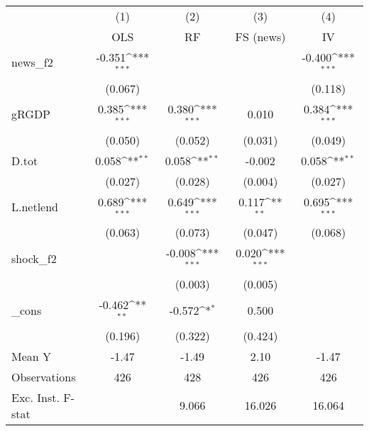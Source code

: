 {
\def\sym#1{\ifmmode^{#1}\else\(^{#1}\)\fi}
\begin{tabular}{l*{4}{c}}
\toprule
            &\multicolumn{1}{c}{(1)}&\multicolumn{1}{c}{(2)}&\multicolumn{1}{c}{(3)}&\multicolumn{1}{c}{(4)}\\
            &\multicolumn{1}{c}{OLS}&\multicolumn{1}{c}{RF}&\multicolumn{1}{c}{FS (news)}&\multicolumn{1}{c}{IV}\\
\midrule
news\_f2     &      -0.351\sym{***}&                     &                     &      -0.400\sym{***}\\
            &     (0.067)         &                     &                     &     (0.118)         \\
\addlinespace
gRGDP       &       0.385\sym{***}&       0.380\sym{***}&       0.010         &       0.384\sym{***}\\
            &     (0.050)         &     (0.052)         &     (0.031)         &     (0.049)         \\
\addlinespace
D.tot       &       0.058\sym{**} &       0.058\sym{**} &      -0.002         &       0.058\sym{**} \\
            &     (0.027)         &     (0.028)         &     (0.004)         &     (0.027)         \\
\addlinespace
L.netlend   &       0.689\sym{***}&       0.649\sym{***}&       0.117\sym{**} &       0.695\sym{***}\\
            &     (0.063)         &     (0.073)         &     (0.047)         &     (0.068)         \\
\addlinespace
shock\_f2    &                     &      -0.008\sym{***}&       0.020\sym{***}&                     \\
            &                     &     (0.003)         &     (0.005)         &                     \\
\addlinespace
\_cons      &      -0.462\sym{**} &      -0.572\sym{*}  &       0.500         &                     \\
            &     (0.196)         &     (0.322)         &     (0.424)         &                     \\
\midrule
Mean Y      &       -1.47         &       -1.49         &        2.10         &       -1.47         \\
Observations&         426         &         428         &         426         &         426         \\
Exc. Inst. F-stat&                     &       9.066         &      16.026         &      16.064         \\
\bottomrule
\end{tabular}
}
